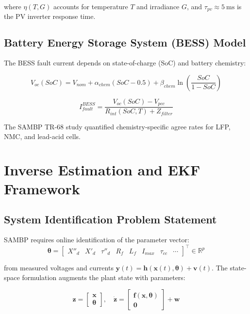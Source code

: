 \documentclass[11pt,a4paper]{report}
\newcommand{\sambp}{\textsc{SAMBP}}
\newcommand{\bvec}[1]{\mathbf{#1}}
\begin{document}
where $\eta(T,G)$ accounts for temperature $T$ and irradiance $G$, and $\tau_{pv}\approx\SI{5}{\milli\second}$ is the PV inverter response time.

\section{Battery Energy Storage System (BESS) Model}

The BESS fault current depends on state-of-charge (SoC) and battery chemistry:

\begin{equation}
\label{eq:bess}
V_{oc}(SoC) = V_{nom} + \alpha_{chem}\left(SoC - 0.5\right) + \beta_{chem}\ln\!\left(\frac{SoC}{1-SoC}\right)
\end{equation}

\begin{equation}
I_{fault}^{BESS} = \frac{V_{oc}(SoC) - V_{pcc}}{R_{int}(SoC,T) + Z_{filter}}
\end{equation}

The SAMBP TR-68 study quantified chemistry-specific agree rates for LFP, NMC, and lead-acid cells.

\chapter{Inverse Estimation and EKF Framework}
\label{ch:estimation}

\section{System Identification Problem Statement}

\sambp{} requires online identification of the parameter vector:
\begin{equation}
\bvec{\theta} = \begin{bmatrix} X''_d & X'_d & \tau''_d & R_f & L_f & I_{max} & \tau_{cc} & \cdots \end{bmatrix}^\top \in \mathbb{R}^p
\end{equation}

from measured voltages and currents $\bvec{y}(t) = \bvec{h}(\bvec{x}(t),\bvec{\theta}) + \bvec{v}(t)$. The state-space formulation augments the plant state with parameters:

\begin{equation}
\bvec{z} = \begin{bmatrix} \bvec{x} \\ \bvec{\theta} \end{bmatrix}, \quad
\dot{\bvec{z}} = \begin{bmatrix} \bvec{f}(\bvec{x},\bvec{\theta}) \\ \bvec{0} \end{bmatrix} + \bvec{w}
\end{equation}
\end{document}
